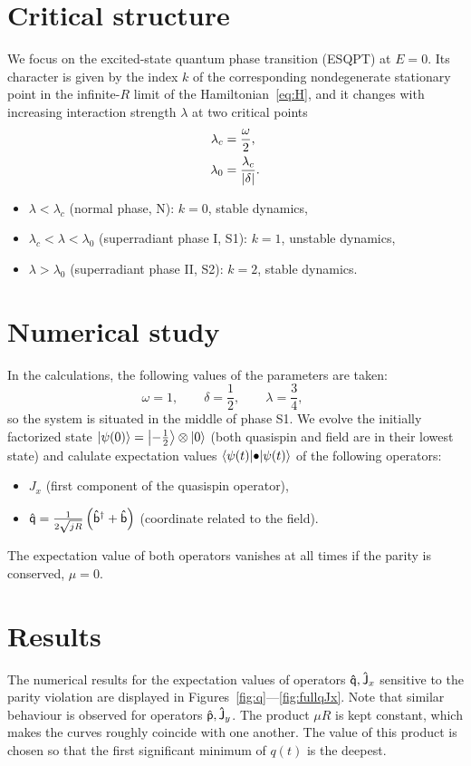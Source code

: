 \documentclass[a4paper,11pt,twoside]{article}
\begin{document}
\section{Critical structure}
	We focus on the excited-state quantum phase transition (ESQPT) at $E=0$.
	Its character is given by the index $k$ of the corresponding nondegenerate stationary point in the infinite-$R$ limit of the Hamiltonian~\eqref{eq:H}, and it changes with increasing interaction strength $\lambda$ at two critical points
	\begin{align}
		\lambda_{c}&=\frac{\omega}{2},\\
		\lambda_{0}&=\frac{\lambda_{c}}{\left|{\delta}\right|}.
	\end{align}
	\begin{itemize}
		\item $\lambda<\lambda_{c}$ (normal phase, N): $k=0$, stable dynamics,
		\item $\lambda_{c}<\lambda<\lambda_{0}$ (superradiant phase I, S1): $k=1$, unstable dynamics,
		\item $\lambda>\lambda_{0}$ (superradiant phase II, S2): $k=2$, stable dynamics.
	\end{itemize}

\section{Numerical study}
	In the calculations, the following values of the parameters are taken:
	\begin{equation}
		\omega=1,\qquad
		\delta=\frac{1}{2},\qquad
		\lambda=\frac{3}{4},\qquad
	\end{equation}
	so the system is situated in the middle of phase S1.
	We evolve the initially factorized state $\left|{\psi(0)}\right\rangle=\left|{-\frac{1}{2}}\right\rangle\otimes\left|{0}\right\rangle$ (both quasispin and field are in their lowest state) and calulate expectation values $\left\langle{\psi(t)}\middle|{\bullet}\middle|{\psi(t)}\right\rangle$ of the following operators:
	\begin{itemize}
		\item $J_{x}$ (first component of the quasispin operator),
		\item $\mathsf{\hat{q}}=\frac{1}{2\sqrt{jR}}\left({\mathsf{\hat{b}}}^{\dagger}+\mathsf{\hat{b}}\right)$ (coordinate related to the field).
	\end{itemize}
	The expectation value of both operators vanishes at all times if the parity is conserved, \ie $\mu=0$.

\section{Results}
The numerical results for the expectation values of operators $\mathsf{\hat{q}}, \mathsf{\hat{J}}_{x}$ sensitive to the parity violation are displayed in Figures~\ref{fig:q}---\ref{fig:fullqJx}.
Note that similar behaviour is observed for operators $\mathsf{\hat{p}}, \mathsf{\hat{J}}_{y}$.
The product $\mu R$ is kept constant, which makes the curves roughly coincide with one another.
The value of this product is chosen so that the first significant minimum of $q(t)$ is the deepest.
\end{document}
